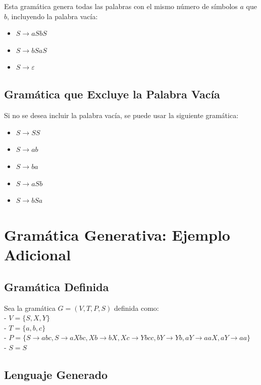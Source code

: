 \documentclass[12pt]{report} %
\providecommand{\tightlist}{%
  \setlength{\itemsep}{0pt}\setlength{\parskip}{0pt}}
\begin{document}
Esta gramática genera todas las palabras con el mismo número de símbolos
\(a\) que \(b\), incluyendo la palabra vacía:

\begin{itemize}
\tightlist
\item
  \(S \to aSbS\)
\item
  \(S \to bSaS\)
\item
  \(S \to \varepsilon\)
\end{itemize}

\hypertarget{gramuxe1tica-que-excluye-la-palabra-vacuxeda}{%
\subsection{Gramática que Excluye la Palabra
Vacía}\label{gramuxe1tica-que-excluye-la-palabra-vacuxeda}}

Si no se desea incluir la palabra vacía, se puede usar la siguiente
gramática:

\begin{itemize}
\tightlist
\item
  \(S \to SS\)
\item
  \(S \to ab\)
\item
  \(S \to ba\)
\item
  \(S \to aSb\)
\item
  \(S \to bSa\)
\end{itemize}

\hypertarget{gramuxe1tica-generativa-ejemplo-adicional}{%
\section{Gramática Generativa: Ejemplo
Adicional}\label{gramuxe1tica-generativa-ejemplo-adicional}}

\hypertarget{gramuxe1tica-definida-1}{%
\subsection{Gramática Definida}\label{gramuxe1tica-definida-1}}

Sea la gramática \(G = (V, T, P, S)\) definida como:\\
- \(V = \{S, X, Y\}\)\\
- \(T = \{a, b, c\}\)\\
-
\(P = \{  S \to abc,  S \to aXbc,  Xb \to bX,  Xc \to Ybcc,  bY \to Yb,  aY \to aaX,  aY \to aa \}\)\\
- \(S = S\)

\hypertarget{lenguaje-generado-1}{%
\subsection{Lenguaje Generado}\label{lenguaje-generado-1}}
\end{document}
